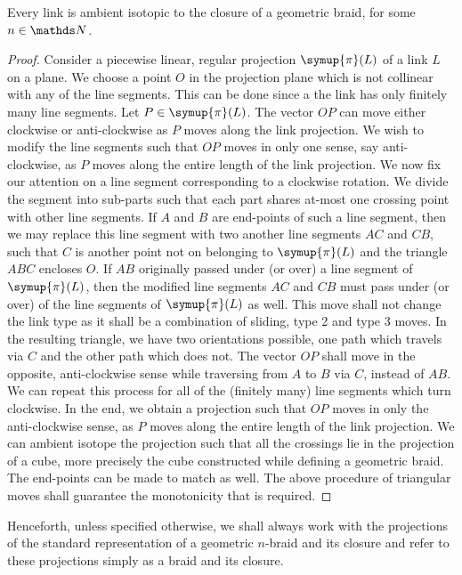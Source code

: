 \begin{thm}[Alexander]
	Every link is ambient isotopic to the closure of a geometric braid, for some \(n \in \symbb{N}\).
\end{thm}
\begin{proof}
	Consider a piecewise linear, regular projection \(\symup{\pi}(L)\) of a link \(L\) on a plane. We choose a point \(O\) in the projection plane which is not collinear with any of the line segments. This can be done since a the link has only finitely many line segments. Let \(P \in \symup{\pi}(L)\). The vector \(OP\) can move either clockwise or anti-clockwise as \(P\) moves along the link projection. We wish to modify the line segments such that \(OP\) moves in only one sense, say anti-clockwise, as \(P\) moves along the entire length of the link projection. We now fix our attention on a line segment corresponding to a clockwise rotation. We divide the segment into sub-parts such that each part shares at-most one crossing point with other line segments. If \(A\) and \(B\) are end-points of such a line segment, then we may replace this line segment with two another line segments \(AC\) and \(CB\), such that \(C\) is another point not on belonging to \(\symup{\pi}(L)\) and the triangle \(ABC\) encloses \(O\). If \(AB\) originally passed under (or over) a line segment of \(\symup{\pi}(L)\), then the modified line segments \(AC\) and \(CB\) must pass under (or over) of the line segments of \(\symup{\pi}(L)\) as well. This move shall not change the link type as it shall be a combination of sliding, type 2 and type 3 moves. In the resulting triangle, we have two orientations possible, one path which travels via \(C\) and the other path which does not. The vector \(OP\) shall move in the opposite, anti-clockwise sense while traversing from \(A\) to \(B\) via \(C\), instead of \(AB\). We can repeat this process for all of the (finitely many) line segments which turn clockwise. In the end, we obtain a projection such that \(OP\) moves in only the anti-clockwise sense, as \(P\) moves along the entire length of the link projection. We can ambient isotope the projection such that all the crossings lie in the projection of a cube, more precisely the cube constructed while defining a geometric braid. The end-points can be made to match as well. The above procedure of triangular moves shall guarantee the monotonicity that is required.
\end{proof}

Henceforth, unless specified otherwise, we shall always work with the projections of the standard representation of a geometric \(n\)-braid and its closure and refer to these projections simply as a braid and its closure.

